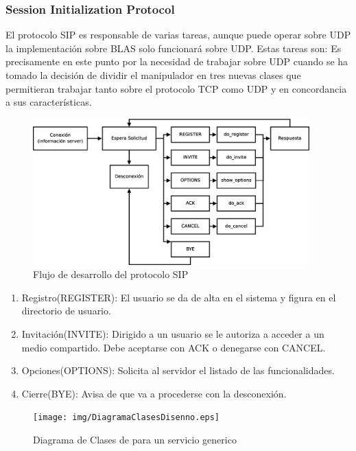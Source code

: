 \documentclass[a4paper,spanish,12pt]{book}
\begin{document}
\subsubsection{Session Initialization Protocol}
El protocolo SIP es responsable de varias tareas, aunque puede operar sobre UDP la implementación sobre BLAS solo funcionará sobre UDP. Estas tareas son:
Es precisamente en este punto por la necesidad de trabajar sobre UDP cuando se ha tomado la decisión de dividir el manipulador en tres nuevas clases que permitieran trabajar tanto sobre el protocolo TCP como UDP y en concordancia a sus características.
\begin{figure}[h]
	\includegraphics[width=0.95\textwidth]{img/DiagramaFlujoSIP.eps}
              \caption{Flujo de desarrollo del protocolo SIP}
  \label{fig:DiagramaFlujoSIP}

\end{figure}

\begin{enumerate}
	\item{Registro(REGISTER): El usuario se da de alta en el sistema y figura en el directorio de usuario.}
	\item{Invitación(INVITE): Dirigido a un usuario se le autoriza a acceder a un medio compartido. Debe aceptarse con ACK o denegarse con CANCEL.}
	\item{Opciones(OPTIONS): Solicita al servidor el listado de las funcionalidades.}
	\item{Cierre(BYE): Avisa de que va a procederse con la desconexión.}
\end{enumerate}

\begin{figure}[h]
	\texttt{[image: img/DiagramaClasesDisenno.eps]}
	\caption{Diagrama de Clases de para un servicio generico} 
	      \label{fig:DiagramaClasesDiseño}
\end{figure}
\end{document}
